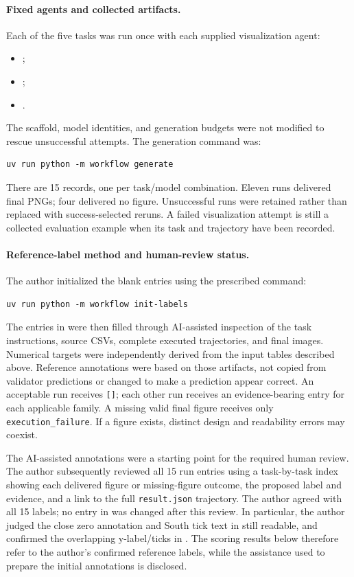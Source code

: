 \documentclass[11pt]{article}
\begin{document}
\paragraph{Fixed agents and collected artifacts.}
Each of the five tasks was run once with each supplied visualization agent:
\begin{itemize}
\item {};
\item {};
\item {}.
\end{itemize}
The scaffold, model identities, and generation budgets were not modified to
rescue unsuccessful attempts. The generation command was:
\begin{verbatim}
uv run python -m workflow generate
\end{verbatim}
There are 15  records, one per
task/model combination. Eleven runs delivered final PNGs; four delivered
no figure. Unsuccessful runs were retained rather than replaced with
success-selected reruns. A failed visualization attempt is still a collected
evaluation example when its task and trajectory have been recorded.

\paragraph{Reference-label method and human-review status.}
The author initialized the blank entries using the prescribed command:
\begin{verbatim}
uv run python -m workflow init-labels
\end{verbatim}
The entries in  were then filled through AI-assisted
inspection of the task instructions, source CSVs, complete executed
trajectories, and final images. Numerical targets were independently derived
from the input tables described above. Reference annotations were based on
those artifacts, not copied from validator predictions or changed to make a
prediction appear correct.
An acceptable run receives \texttt{[]}; each other run receives an
evidence-bearing entry for each applicable family.
A missing valid final figure receives only \texttt{execution\_failure}.
If a figure exists, distinct design and readability errors may coexist.

The AI-assisted annotations were a starting point for the required
human review. The author subsequently reviewed all 15 run entries using
a task-by-task index showing each delivered figure or missing-figure
outcome, the proposed label and evidence, and a link to the full
\texttt{result.json} trajectory. The author agreed with all 15 labels;
no entry in  was changed after this review.
In particular, the author judged the close zero annotation and South
tick text in  still readable, and
confirmed the overlapping y-label/ticks in
. The scoring results below therefore
refer to the author's confirmed reference labels, while the assistance
used to prepare the initial annotations is disclosed.
\end{document}
